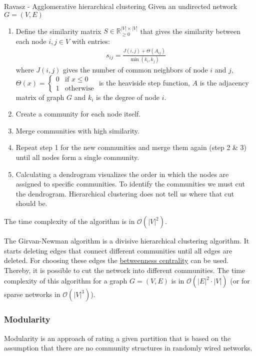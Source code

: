 \documentclass[english]{panikzettel}
\begin{document}
\begin{algo}{Ravasz - Agglomerative hierarchical clustering}
Given an undirected network $ G = (V,E) $
\begin{enumerate}
	\item Define the similarity matrix $ S \in \mathbb{R}_{\geq 0}^{|V| \times |V|} $ that gives the similarity between each node $ i,j \in V $ with entries:
	\begin{align*}
		s_{ij} = \frac{J(i,j) + \Theta (A_{ij})}{\min(k_i, k_j)}
	\end{align*}
	where $ J(i,j) $ gives the number of common neighbors of node $ i $ and $ j $, $ \Theta(x) = \begin{cases}
	0 & \text{if } x \leq 0 \\
	1 & \text{otherwise}
	\end{cases} $ is the heaviside step function, $ A $ is the adjacency matrix of graph $ G $ and $ k_i $ is the degree of node $ i $.
	
	\item Create a community for each node itself. 
	\item Merge communities with high similarity.
	\item Repeat step 1 for the new communities and merge them again (step 2 \& 3) until all nodes form a single community.
	\item Calculating a dendrogram visualizes the order in which the nodes are assigned to specific communities.
	To identify the communities we must cut	the dendrogram. 
	Hierarchical clustering	does not tell us where that cut should be.
\end{enumerate}
\end{algo}
The time complexity of the algorithm is in $ \mathcal{O}(|V|^2) $.

The Girvan-Newman algorithm is a divisive hierarchical clustering algorithm. 
It starts deleting edges that connect different communities until all edges are deleted.
For choosing these edges the \hyperref[sec:betweenness_centrality]{betweenness centrality} can be used.
Thereby, it is possible to cut the network into different communities.
The time complexity of this algorithm for a graph $ G = (V,E) $ is in $ \mathcal{O}(|E|^2 \cdot |V|) $ (or for sparse networks in $ \mathcal{O}(|V|^3) $).

\subsubsection{Modularity}
Modularity is an approach of rating a given partition that is based on the assumption that there are no community structures in randomly wired networks.
\end{document}
